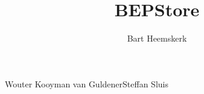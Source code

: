 \documentclass[oneside]{tudelft-report}
\begin{document}
\frontmatter

\title[Final report\\TI3806 - Bachelorproject]{BEPStore}
\author{Bart Heemskerk}{Wouter Kooyman van Guldener}{Steffan Sluis}
\makecover








\tableofcontents

\glsresetall

\mainmatter








\appendix












\end{document}
